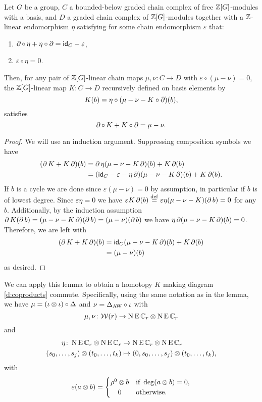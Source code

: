 \begin{lemma}\label{l:homotopyK}
	Let $G$ be a group, $C$ a bounded-below graded chain complex of free $\mathbb{Z}[G]$-modules with a basis, and $D$ a graded chain complex of $\mathbb{Z}[G]$-modules together with a $\mathbb{Z}$-linear endomorphism $\eta$ satisfying for some chain endomorphism $\varepsilon$ that:
	\begin{enumerate}
		\item $\operatorname{\partial} \circ \, \eta + \eta \circ \operatorname{\partial} = \mathsf{id}_C - \varepsilon$,
		\item $\varepsilon\circ \eta = 0$.
	\end{enumerate}
	Then, for any pair of $\mathbb{Z}[G]$-linear chain maps $\mu,\nu \colon C \to D$ with $\varepsilon \circ (\mu-\nu) = 0$, the $\mathbb{Z}[G]$-linear map $K \colon C \to D$ recursively defined on basis elements by
	\[
	K(b) = \eta \circ (\mu - \nu - K \circ \operatorname{\partial})(b),
	\]
	satisfies
	\[
	\operatorname{\partial} \circ \, K + K \circ \operatorname{\partial} = \mu - \nu.
	\]
\end{lemma}

\begin{proof}
	We will use an induction argument.
	Suppressing composition symbols we have
	\begin{align*}
		(\operatorname{\partial} K+ K\operatorname{\partial})(b)
		&= \operatorname{\partial} \eta(\mu-\nu-K\operatorname{\partial})(b) + K\operatorname{\partial}(b) \\
		&= (\mathsf{id}_C - \varepsilon - \eta\operatorname{\partial})(\mu-\nu - K\operatorname{\partial})(b) + K\operatorname{\partial}(b).
	\end{align*}
	If $b$ is a cycle we are done since $\varepsilon(\mu-\nu) = 0$ by assumption, in particular if $b$ is of lowest degree.
	Since $\varepsilon \eta = 0$ we have $\varepsilon K \operatorname{\partial}(b) \stackrel{\mathrm{def}}{=} \varepsilon \eta(\mu-\nu-K)(\operatorname{\partial} b) = 0$ for any $b$.
	Additionally, by the induction assumption $\operatorname{\partial} K (\operatorname{\partial} b) = (\mu-\nu-K\operatorname{\partial})(\operatorname{\partial} b) = (\mu-\nu)(\operatorname{\partial} b)$ we have $\eta \operatorname{\partial} (\mu-\nu - K\operatorname{\partial})(b) = 0$.
	Therefore, we are left with
	\begin{align*}
		(\operatorname{\partial} K+ K\operatorname{\partial})(b) &=
		\mathsf{id}_C(\mu-\nu-K\operatorname{\partial})(b)+K\operatorname{\partial}(b) \\&=
		(\mu-\nu)(b)
	\end{align*}
	as desired.
\end{proof}

We can apply this lemma to obtain a homotopy $K$ making diagram \eqref{d:coproducts} commute.
Specifically, using the same notation as in the lemma, we have $\mu = (\iota \otimes \iota) \circ \Delta$ and $\nu = \Delta_{\operatorname{AW}} \circ \iota$ with
\[
\mu,\nu \colon \mathcal{W}(r) \to \operatorname{N}\operatorname{E}\mathbb{C}_r \otimes \operatorname{N}\operatorname{E}\mathbb{C}_r
\]
and
\begin{align*}
	\eta \colon \operatorname{N}\operatorname{E}\mathbb{C}_r \otimes \operatorname{N}\operatorname{E}\mathbb{C}_r &\to \operatorname{N}\operatorname{E}\mathbb{C}_r \otimes \operatorname{N}\operatorname{E}\mathbb{C}_r \\
	(s_0,\dots,s_j) \otimes (t_0,\dots,t_k) &\mapsto (0,s_0,\dots,s_j) \otimes (t_0,\dots,t_k),
\end{align*}
with
\[
\varepsilon(a \ot b) =
\begin{cases}
	\rho^0 \ot b & \text{if } \deg(a \ot b) = 0, \\
	\hfil0 & \text{otherwise}.
\end{cases}
\]

